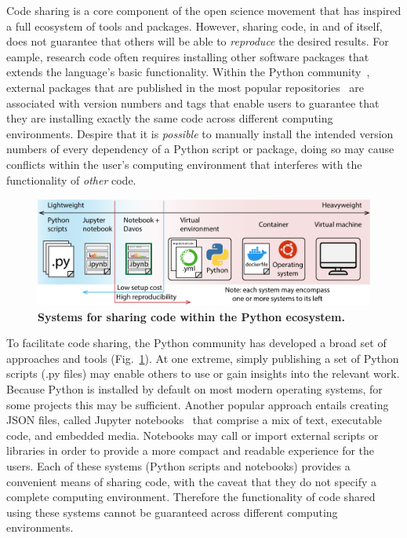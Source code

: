 \documentclass[preprint,12pt, a4paper]{elsarticle}
\begin{document}
Code sharing is a core component of the open science movement
that has inspired a full ecosystem of tools and packages.  However,
sharing code, in and of itself, does not guarantee that others will be
able to \textit{reproduce} the desired results.  For eample, research
code often requires installing other software packages that extends
the language's basic functionality.  Within the Python community~\citep{vanR95},
external packages that are published in the most popular 
repositories~\citep{pypi, Anac12} are associated with version numbers
and tags that enable users to guarantee that they are installing
exactly the same code across different computing environments.
Despire that it is \textit{possible} to manually install the intended version numbers of
every dependency of a Python script or package, doing so may cause
conflicts within the user's computing environment that interferes with
the functionality of  \textit{other} code.

\begin{figure}[t]
\centering
\includegraphics[width=\textwidth]{figs/shareable_code}
\caption{\small \textbf{Systems for sharing code within the Python ecosystem.}}
\label{fig:code-sharing}
\end{figure}

To facilitate code sharing, the Python community has developed a broad
set of approaches and tools (Fig.~\ref{fig:code-sharing}).  At one
extreme, simply publishing a set of Python scripts (.py files) may
enable others to use or gain insights into the relevant work.  Because
Python is installed by default on most modern operating systems, for
some projects this may be sufficient.  Another popular approach entails
creating JSON files, called Jupyter notebooks~\citep{KluyEtal16} that
comprise a mix of text, executable code, and embedded media.
Notebooks may call or import external scripts or libraries in order to
provide a more compact and readable experience for the users.  Each of
these systems (Python scripts and notebooks) provides a convenient
means of sharing code, with the caveat that they do not specify a
complete computing environment.  Therefore the functionality of code
shared using these systems cannot be guaranteed across different
computing environments.
\end{document}
